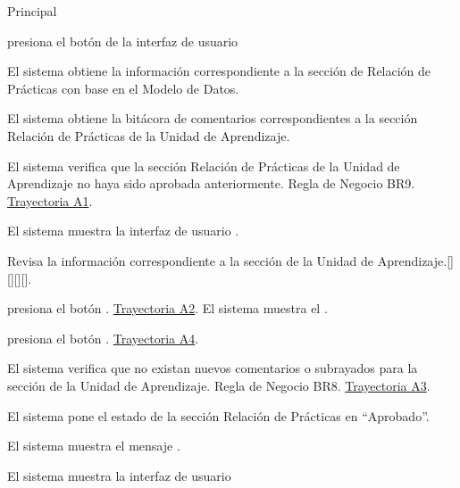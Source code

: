 \begin{UCtrayectoria}{Principal}

    \UCpaso[\UCactor] presiona el botón   de la interfaz de usuario 

    \UCpaso El sistema obtiene la información correspondiente a la sección de Relación de Prácticas con base en el Modelo de Datos.
    
    \UCpaso El sistema obtiene la bitácora de comentarios correspondientes a la sección Relación de Prácticas de la Unidad de Aprendizaje. 
    
    \UCpaso El sistema verifica que la sección Relación de Prácticas de la Unidad de Aprendizaje no haya sido aprobada anteriormente. Regla de Negocio BR9. \hyperlink{SP2-CU7-A1}{Trayectoria A1}. 
    
    \UCpaso El sistema muestra la interfaz de usuario  .
    
    \UCpaso[\UCactor] Revisa la información correspondiente a la sección de la Unidad de Aprendizaje.[][][][].
    
    \UCpaso[\UCactor] presiona el botón . \hyperlink{SP2-CU7-A2}{Trayectoria A2}.
    \UCpaso El sistema muestra el .
    
    \UCpaso [\UCactor] presiona el botón . \hyperlink{SP2-CU7-A4}{Trayectoria A4}.
    
    \UCpaso	El sistema verifica que no existan nuevos comentarios o subrayados para la sección de la Unidad de Aprendizaje. Regla de Negocio BR8. \hyperlink{SP2-CU7-A3}{Trayectoria A3}. 
    
    \UCpaso El sistema pone el estado de la sección Relación de Prácticas en “Aprobado”.
    
    \UCpaso El sistema muestra el mensaje .

    \UCpaso El sistema muestra la interfaz de usuario 

\end{UCtrayectoria}


